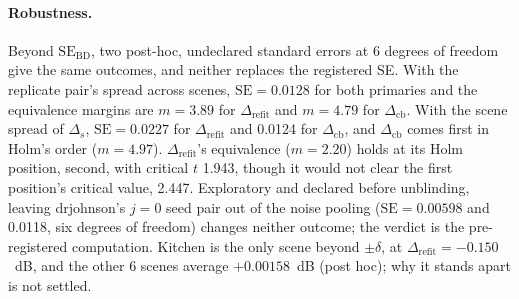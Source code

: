 \paragraph{Robustness.}
Beyond $\mathrm{SE}_{\mathrm{BD}}$, two post-hoc, undeclared standard errors at 6 degrees of freedom give the same outcomes, and neither replaces the registered SE. %
With the replicate pair's spread across scenes, $\mathrm{SE} = 0.0128$ for both primaries and the equivalence margins are $m = 3.89$ for $\Delta_{\mathrm{refit}}$ and $m = 4.79$ for $\Delta_{\mathrm{cb}}$. %
With the scene spread of $\Delta_s$, $\mathrm{SE} = 0.0227$ for $\Delta_{\mathrm{refit}}$ and 0.0124 for $\Delta_{\mathrm{cb}}$, and $\Delta_{\mathrm{cb}}$ comes first in Holm's order ($m = 4.97$). %
$\Delta_{\mathrm{refit}}$'s equivalence ($m = 2.20$) holds at its Holm position, second, with critical $t$ 1.943, though it would not clear the first position's critical value, 2.447. %
Exploratory and declared before unblinding, leaving drjohnson's $j = 0$ seed pair out of the noise pooling ($\mathrm{SE} = 0.00598$ and 0.0118, six degrees of freedom) changes neither outcome; the verdict is the pre-registered computation. %
Kitchen is the only scene beyond $\pm\delta$, at $\Delta_{\mathrm{refit}} = -0.150$~dB, and the other 6 scenes average $+0.00158$~dB (post hoc); why it stands apart is not settled. %

